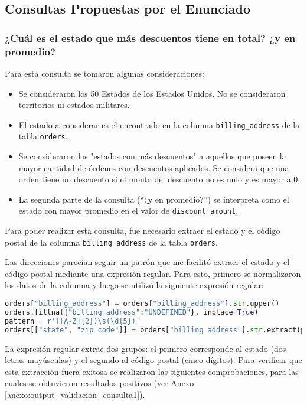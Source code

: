 \subsection{Consultas Propuestas por el Enunciado}

\subsubsection{¿Cuál es el estado que más descuentos tiene en total? ¿y en promedio?}

Para esta consulta se tomaron algunas consideraciones:
\begin{itemize}
    \item Se consideraron los 50 Estados de los Estados Unidos. No se consideraron territorios ni estados militares.
    \item El estado a considerar es el encontrado en la columna \texttt{billing\_address} de la tabla \texttt{orders}.
    \item Se consideraron los "estados con más descuentos" a aquellos que poseen la mayor cantidad de órdenes con descuentos aplicados. Se considera que una orden tiene un descuento si el monto del descuento no es nulo y es mayor a 0.
    \item La segunda parte de la consulta (``¿y en promedio?'') se interpreta como el estado con mayor promedio en el valor de \texttt{discount\_amount}.
\end{itemize}

Para poder realizar esta consulta, fue necesario extraer el estado y el código postal de la columna \texttt{billing\_address} de la tabla \texttt{orders}. 

Las direcciones parecían seguir un patrón que me facilitó extraer el estado y el código postal mediante una expresión regular.
Para esto, primero se normalizaron los datos de la columna y luego se utilizó la siguiente expresión regular:

\begin{lstlisting}[language=Python]
orders["billing_address"] = orders["billing_address"].str.upper()
orders.fillna({"billing_address":"UNDEFINED"}, inplace=True)
pattern = r'([A-Z]{2})\s(\d{5})'
orders[["state", "zip_code"]] = orders["billing_address"].str.extract(pattern)
\end{lstlisting}

La expresión regular extrae dos grupos: el primero corresponde al estado (dos letras mayúsculas) y el segundo al código postal (cinco dígitos).
Para verificar que esta extracción fuera exitosa se realizaron las siguientes comprobaciones, para las cuales se obtuvieron resultados positivos (ver Anexo \ref{anexo:output_validacion_consulta1}).

